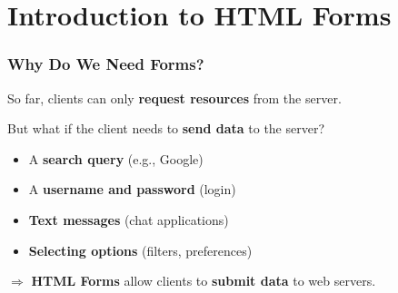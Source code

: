 \documentclass[xcolor=table]{beamer}
\begin{document}

\section{Introduction to HTML Forms}

\begin{frame}
\frametitle{Why Do We Need Forms?}

So far, clients can only \textbf{request resources} from the server.

\vspace{0.3cm}

But what if the client needs to \textbf{send data} to the server?

\vspace{0.3cm}

\begin{itemize}
\item A \textbf{search query} (e.g., Google)
\item A \textbf{username and password} (login)
\item \textbf{Text messages} (chat applications)
\item \textbf{Selecting options} (filters, preferences)
\end{itemize}

\vspace{0.4cm}

\begin{center}
$\Rightarrow$ \textbf{HTML Forms} allow clients to \textbf{submit data} to web servers.
\end{center}

\end{frame}
\end{document}
